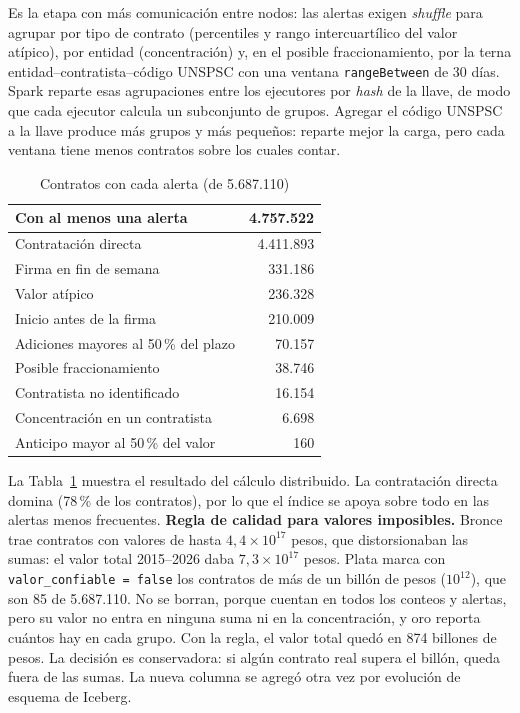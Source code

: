 \documentclass[conference]{IEEEtran}
\begin{document}
Es la etapa con más comunicación entre nodos: las alertas exigen \textit{shuffle} para agrupar por tipo de contrato (percentiles y rango intercuartílico del valor atípico), por entidad (concentración) y, en el posible fraccionamiento, por la terna entidad--contratista--código UNSPSC con una ventana \texttt{rangeBetween} de 30 días. Spark reparte esas agrupaciones entre los ejecutores por \textit{hash} de la llave, de modo que cada ejecutor calcula un subconjunto de grupos. Agregar el código UNSPSC a la llave produce más grupos y más pequeños: reparte mejor la carga, pero cada ventana tiene menos contratos sobre los cuales contar.

\begin{table}[htbp]
\caption{Contratos con cada alerta (de 5.687.110)}
\label{tab:alertas}
\centering
\begin{tabular}{@{}lr@{}}
\toprule
Con al menos una alerta & 4.757.522 \\
\midrule
Contratación directa & 4.411.893 \\
Firma en fin de semana & 331.186 \\
Valor atípico & 236.328 \\
Inicio antes de la firma & 210.009 \\
Adiciones mayores al 50\,\% del plazo & 70.157 \\
Posible fraccionamiento & 38.746 \\
Contratista no identificado & 16.154 \\
Concentración en un contratista & 6.698 \\
Anticipo mayor al 50\,\% del valor & 160 \\
\bottomrule
\end{tabular}
\end{table}

La Tabla~\ref{tab:alertas} muestra el resultado del cálculo distribuido. La contratación directa domina (78\,\% de los contratos), por lo que el índice se apoya sobre todo en las alertas menos frecuentes. \textbf{Regla de calidad para valores imposibles.} Bronce trae contratos con valores de hasta $4{,}4\times10^{17}$ pesos, que distorsionaban las sumas: el valor total 2015--2026 daba $7{,}3\times10^{17}$ pesos. Plata marca con \texttt{valor\_confiable = false} los contratos de más de un billón de pesos ($10^{12}$), que son 85 de 5.687.110. No se borran, porque cuentan en todos los conteos y alertas, pero su valor no entra en ninguna suma ni en la concentración, y oro reporta cuántos hay en cada grupo. Con la regla, el valor total quedó en 874 billones de pesos. La decisión es conservadora: si algún contrato real supera el billón, queda fuera de las sumas. La nueva columna se agregó otra vez por evolución de esquema de Iceberg.
\end{document}
